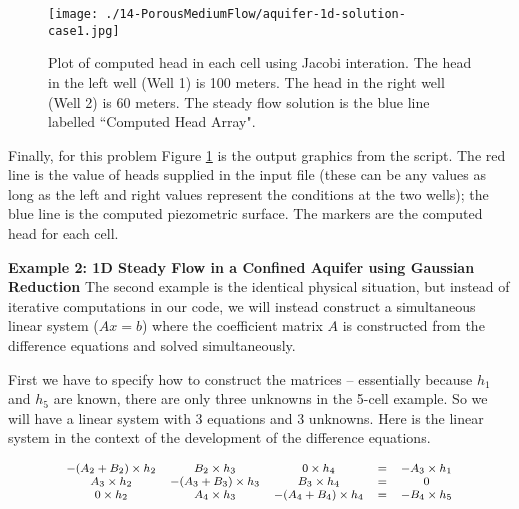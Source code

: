 \begin{figure}[h!] %
   \centering
   \texttt{[image: ./14-PorousMediumFlow/aquifer-1d-solution-case1.jpg]} 
   \caption{Plot of computed head in each cell using Jacobi interation.   The head in the left well (Well 1) is 100 meters.   The head in the right well (Well 2) is 60 meters.  The steady flow solution is the blue line labelled ``Computed Head Array".}
   \label{fig:aquifer-1d-solution-case1}
\end{figure}
\newpage
Finally, for this problem Figure \ref{fig:aquifer-1d-solution-case1} is the output graphics from the script.  The red line is the value of heads supplied in the input file (these can be any values as long as the left and right values represent the conditions at the two wells); the blue line is the computed piezometric surface.  The markers are the computed head for each cell.

\textbf{Example 2: 1D Steady Flow in a Confined Aquifer using Gaussian Reduction}
The second example is the identical physical situation, but instead of iterative computations in our code, we will instead construct a simultaneous linear system ($Ax=b$) where the coefficient matrix $A$ is constructed from the difference equations and solved simultaneously.   

First we have to specify how to construct the matrices -- essentially because $h_1$ and $h_5$ are known, there are only three unknowns in the 5-cell example.  So we will have a linear system with 3 equations and 3 unknowns.  Here is the linear system in the context of the development of the difference equations.

\begin{displaymath}
\footnotesize
\begin{matrix}
-(A_2+B_2)\times h_2  & B_2\times h_3 & 0 \times h_4&  = & -A_3 \times h_1\\
A_3 \times h_2& -(A_3+B_3) \times h_3& B_3 \times h_4&  = & 0\\
0 \times h_2 & A_4 \times h_3 & -(A_4+B_4) \times h_4 & = & - B_4 \times h_5\\
 \end{matrix}
 \normalsize
 \end{displaymath}
 
